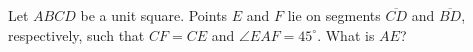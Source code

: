 Let $ABCD$ be a unit square. Points $E$ and $F$ lie on segments $\overline{CD}$ and $\overline{BD}$, respectively, such that $CF=CE$ and $\angle EAF=45^{\circ}$. What is $AE$?
